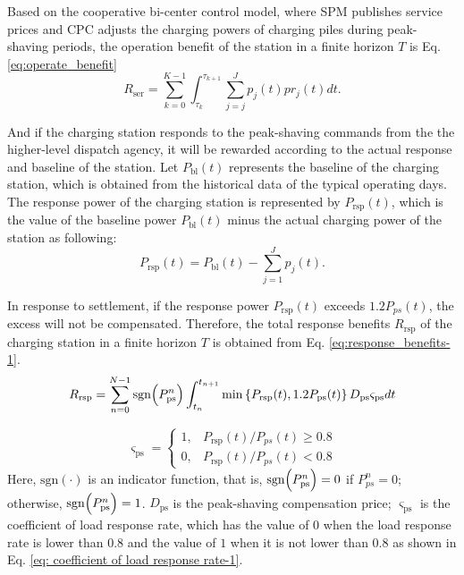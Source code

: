 \documentclass[preprint,12pt]{elsarticle}
\begin{document}
Based on the cooperative bi-center control model, where SPM publishes service prices and CPC adjusts the charging powers of charging piles during peak-shaving periods, the operation benefit of the station in a finite horizon $T$ is  Eq. \ref{eq:operate_benefit}
\begin{equation}
R_{\textrm{ser}}=\sum_{k=0}^{K-1} \int_{\tau_{k}}^{\tau_{k+1}}\sum_{j=j}^{J}p_{j}(t)pr_{j}(t)dt.\label{eq:operate_benefit}
\end{equation}

And if the charging station responds to the peak-shaving commands from the the higher-level dispatch agency, it will be rewarded according to the actual response and baseline of the station. Let $P_{\textrm{bl}}(t)$ represents the baseline of the charging station, which is obtained
from the historical data of the typical operating days. The response power of the charging station is represented by $P_{\textrm{rsp}}\left(t\right)$, which is the value of the baseline power $P_{\textrm{bl}}(t)$ minus
the actual charging power of the station as following:
\begin{equation}
P_{\textrm{rsp}}(t)=P_{\textrm{bl}}(t)-\sum_{j=1}^{J}p_{j}(t).\label{eq:resp_power}
\end{equation}

In response to settlement, if the response power $P_{\textrm{rsp}}\left(t\right)$ exceeds $1.2P_{ps}(t)$, the excess will not be compensated. Therefore, the total response benefits $R_{\textrm{rsp}}$ of the charging station in a finite horizon $T$ is obtained from Eq. \ref{eq:response_benefits-1}.
\begin{equation}
R_{\textrm{rsp}}=\sum_{n=0}^{N-1}\textrm{sgn}\Bigl(P_{\textrm{ps}}^{n}\Bigr)\int_{t_{n}}^{t_{n+1}}\min\left\{ P_{\textrm{rsp}}(t),1.2P_{\textrm{ps}}(t)\right\} D_{\textrm{ps}}\varsigma_{\textrm{ps}}dt\label{eq:response_benefits-1}
\end{equation}

\begin{equation}
\varsigma_{\textrm{ps}}=\begin{cases}
1, & P_{\textrm{rsp}}(t)/P_{ps}(t)\geq0.8\\
0, & P_{\textrm{rsp}}(t)/P_{ps}(t)<0.8
\end{cases}\label{eq: coefficient of load response rate-1}
\end{equation}
Here, $\textrm{sgn}(\cdot)$ is an indicator function, that is, $\textrm{sgn}\Bigl(P_\textrm{ps}^{n}\Bigr)=0$ if $P_{ps}^{n}=0$; otherwise, $\textrm{sgn}\Bigl(P_\textrm{ps}^{n}\Bigr)=1$. $D_\textrm{ps}$ is the peak-shaving compensation price; $\varsigma_\textrm{ps}$ is the coefficient of load response rate, which has the value of $0$ when the load response rate is lower than 0.8 and the value of $1$ when it is not lower than $0.8$ as shown in Eq. \ref{eq: coefficient of load response rate-1}.
\end{document}
